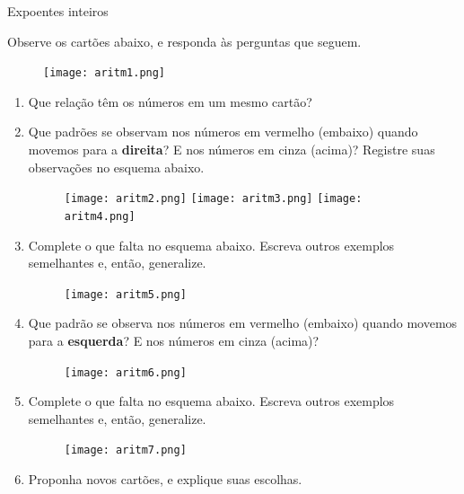 

\begin{task}{Expoentes inteiros}

Observe os cartões abaixo, e responda às perguntas que seguem.

\begin{figure}[H]
\centering
\texttt{[image: aritm1.png]}
\end{figure}

\begin{enumerate}

\item{}
Que relação têm os números em um mesmo cartão?

\item{}
Que padrões se observam nos números em vermelho (embaixo) quando movemos para a \textbf{direita}? E nos números em cinza (acima)? Registre suas observações no esquema abaixo.

\begin{figure}[H]
\centering
\texttt{[image: aritm2.png]} \hspace{0,5cm}
\texttt{[image: aritm3.png]} \hspace{0,5cm}
\texttt{[image: aritm4.png]}
\end{figure}

\item{}
Complete o que falta no esquema abaixo. Escreva outros exemplos semelhantes e, então, generalize.

\begin{figure}[H]
\centering
\texttt{[image: aritm5.png]}
\end{figure}

\item{}
Que padrão se observa nos números em vermelho (embaixo) quando movemos para a \textbf{esquerda}? E nos números em cinza (acima)?

\begin{figure}[H]
\centering
\texttt{[image: aritm6.png]}
\end{figure}

\item{}
Complete o que falta no esquema abaixo. Escreva outros exemplos semelhantes e, então, generalize.

\begin{figure}[H]
\centering
\texttt{[image: aritm7.png]}
\end{figure}

\item{}
Proponha novos cartões, e explique suas escolhas.


\end{enumerate}
\end{task}
